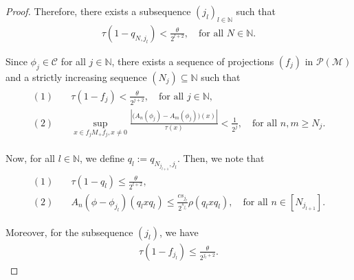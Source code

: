 \documentclass[11pt]{amsart}
\theoremstyle{definition}
\theoremstyle{myremark}
\numberwithin{equation}{section}
\begin{document}
\begin{proof}
		
		\noindent Therefore, there exists a subsequence $(j_l)_{l \in \mathbb{N}}$ such that  
		\begin{align*}
			\tau(1 - q_{N, j_l}) < \frac{\theta}{2^{l+2}},  \quad \text{for all } N \in \mathbb{N}.
		\end{align*}
		
		
		Since $\phi_j \in \mathcal{C}$ for all $j \in \mathbb{N}$, there exists a sequence of projections $(f_j)$ in $\mathcal{P}(\mathcal{M})$ and a strictly increasing sequence $(N_j) \subseteq \mathbb{N}$ such that  
		\begin{align*}
			\begin{split}
				(1)\quad &\tau(1 - f_j)  < \frac{\theta}{2^{j+2}},  \quad \text{for all } j \in \mathbb{N}, \\
				(2)\quad &\sup_{x \in f_j M_+ f_j, x \neq 0} \frac{\left| \big(A_n(\phi_j) - A_m(\phi_j) \big)(x) \right|}{\tau(x)} < \frac{1}{2^j},  \quad \text{for all } n, m \geq N_j.
			\end{split}
		\end{align*}
		
		\noindent Now, for all $l \in \mathbb{N}$, we define $q_l := q_{N_{j_{l+1}}, j_l}$. Then, we note that  
		\begin{align*}
			\begin{split}
				(1)\quad &\tau(1 - q_l) \leq \frac{\theta}{2^{l+2}}, \\
				(2)\quad &A_n(\phi - \phi_{j_l}) (q_l x q_l) \leq   \frac{cs_{j_{l}}}{2^{s_{j_l}}} \rho(q_l x q_l),  
				\quad \text{for all }n \in [N_{j_{l +1}}].
			\end{split}
		\end{align*}
		
		
		
		\noindent Moreover, for the subsequence $(j_l)$, we have  
		\begin{align*}
			\tau(1 - f_{j_l}) \leq \frac{\theta}{2^{j_l+2}}.
		\end{align*}
		

\end{proof}
\end{document}
